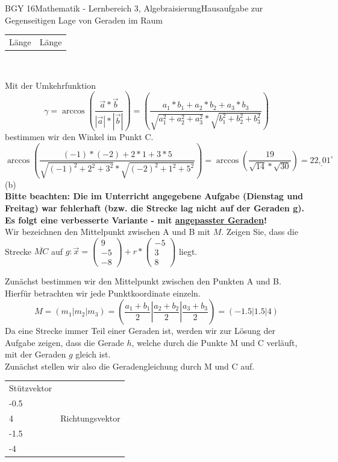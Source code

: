 \documentclass[oneside,openany,headings=optiontotoc,11pt,numbers=noenddot]{scrreprt}
\begin{document}
\begin{worksheet}{BGY 16}{Mathematik - Lernbereich 3, Algebraisierung}{Hausaufgabe zur Gegenseitigen Lage von Geraden im Raum}
\begin{framed}
\begin{tabularx}{\textwidth}{XX}
				Länge & Länge
			\end{tabularx}\\
			\par\noindent
			Mit der Umkehrfunktion \[\gamma = \arccos\left(\frac{\vec{a}*\vec{b}}{|\vec{a}|*|\vec{b}|}\right) = \left(\frac{a_1*b_1 + a_2*b_2 + a_3*b_3}{\sqrt{a_1^2 + a_2^2 + a_3^2}*\sqrt{b_1^2 + b_2^2 + b_3^2}}\right)\] bestimmen wir den Winkel im Punkt C.\\
			\[\arccos\left(\frac{(-1)*(-2) + 2*1 + 3*5}{\sqrt{(-1)^2+2^2+3^2}*\sqrt{(-2)^2+1^2+5^2}}\right) = \arccos\left(\frac{19}{\sqrt{14}*\sqrt{30}}\right) = \underline{22,01^\circ}\]
			(b)\\
			\small{\textbf{\color{red}Bitte beachten: Die im Unterricht angegebene Aufgabe (Dienstag und Freitag) war fehlerhaft (bzw. die Strecke lag nicht auf der Geraden g). Es folgt eine verbesserte Variante - mit \underline{angepasster Geraden}!}}\\
			\normalcolor\normalsize
			Wir bezeichnen den Mittelpunkt zwischen A und B mit \(M\). Zeigen Sie, dass die Strecke \(\overline{MC}\) auf \(g: \vec{x} = \left(\begin{array}{c}9\\-5\\-8\end{array}\right) + r*\left(\begin{array}{c}-5\\3\\8\end{array}\right)\) liegt.\\
			\par\bigskip\noindent
			Zunächst bestimmen wir den Mittelpunkt zwischen den Punkten A und B. Hierfür betrachten wir jede Punktkoordinate einzeln. \[M =(m_1|m_2|m_3) = \left(\frac{a_1+b_1}{2}|\frac{a_2+b_2}{2}|\frac{a_3+b_3}{2}\right) = \left(-1.5|1.5|4\right)\]
			Da eine Strecke immer Teil einer Geraden ist, werden wir zur Lösung der Aufgabe zeigen, dass die Gerade \(h\), welche durch die Punkte M und C verläuft, mit der Geraden \(g\) gleich ist.\\
			Zunächst stellen wir also die Geradengleichung durch M und C auf.\\
			\begin{tabularx}{\textwidth}{XX}
				Stützvektor \(\vec{0M} = \left(\begin{array}{c}1.5\\-0.5\\4\end{array}\right)\) & Richtungsvektor \(\vec{MC} = \vec{C}\vec{M} = \left(\begin{array}{c}2.5\\-1.5\\-4\end{array}\right)\)\\

\end{tabularx}
\end{framed}
\end{worksheet}
\end{document}
